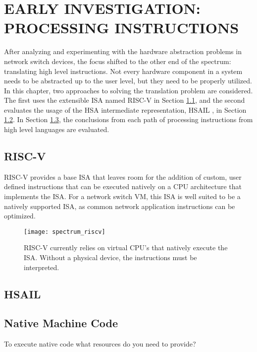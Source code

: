 \chapter{EARLY INVESTIGATION: PROCESSING INSTRUCTIONS}
\label{insn}
After analyzing and experimenting with the hardware abstraction problems in
network switch devices, the focus shifted to the other end of the spectrum:
translating high level instructions. Not every hardware component in a system
needs to be abstracted up to the user level, but they need to be properly
utilized. In this chapter, two approaches to solving the translation problem
are considered. The first uses the extensible ISA named RISC-V in Section
\ref{insn:riscv}, and the second evaluates the usage of the HSA intermediate
representation, HSAIL \cite{hsail}, in Section \ref{insn:hsail}. In Section
\ref{insn:native}, the conclusions from each path of processing instructions
from high level languages are evaluated.

\section{RISC-V}
\label{insn:riscv}
RISC-V provides a base ISA that leaves room for the addition of custom, user
defined instructions that can be executed natively on a CPU architecture that
implements the ISA. For a network switch VM, this ISA is well suited to be a
natively supported ISA, as common network application instructions can be
optimized.

\begin{figure}[h!]
  \centering
  \texttt{[image: spectrum\_riscv]}
  \caption{RISC-V currently relies on virtual CPU's that natively execute the
  ISA. Without a physical device, the instructions must be interpreted.}
  \label{spectrum_riscv}
\end{figure}

\section{HSAIL}
\label{insn:hsail}
\cite{hsail}

\section{Native Machine Code}
\label{insn:native}
To execute native code what resources do you need to provide?
